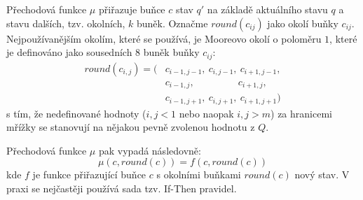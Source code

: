 \documentclass[a4paper,10pt]{article}
\begin{document}
Přechodová funkce $\mu$ přiřazuje buňce $c$ stav $q'$ na základě aktuálního stavu $q$ a stavu dalších, tzv. okolních, $k$ buněk. Označme $round(c_{ij})$ jako okolí buňky $c_{ij}$. Nejpoužívanějším okolím, které se používá, je Mooreovo okolí o poloměru $1$, které je definováno jako sousedních $8$ buněk buňky $c_{ij}$:
\begin{align*}
 round(c_{i,j}) = (
  & c_{i-1, j-1},\ 	c_{i, j-1},\ 	c_{i+1, j-1},	\\
  & c_{i-1, j  },\ 	\qquad \qquad\ 	c_{i+1, j  },	\\
  & c_{i-1, j+1},\ 	c_{i, j+1},\ 	c_{i+1, j+1}	
 )
\end{align*}
s tím, že nedefinované hodnoty ($i,j < 1$ nebo naopak $i,j > m$) za hranicemi mřížky se stanovují na nějakou pevně zvolenou hodnotu z $Q$.

Přechodová funkce $\mu$ pak vypadá následovně:
$$
\mu(c, round(c)) = f(c, round(c))
$$
kde $f$ je funkce přiřazující buňce $c$ s okolními buňkami $round(c)$ nový stav. V praxi se nejčastěji používá sada tzv. If-Then pravidel.
\end{document}

